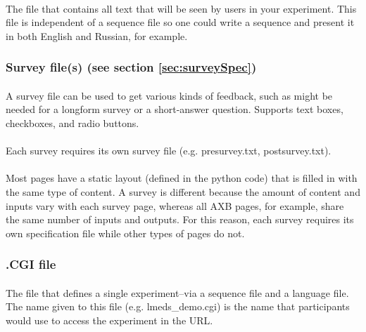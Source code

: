 \paragraph{}
The file that contains all text that will be seen by users in your experiment.  This file is independent of a sequence file so one could write a sequence and present it in both English and Russian, for example.

\subsubsection{Survey file(s) (see section \ref{sec:surveySpec})}

\paragraph{}
A survey file can be used to get various kinds of feedback, such as might be needed for a longform survey or a short-answer question.  Supports text boxes, checkboxes, and radio buttons.

\paragraph{}
Each survey requires its own survey file (e.g. presurvey.txt, postsurvey.txt).

\paragraph{}
Most pages have a static layout (defined in the python code) that is filled in with the same type of content.  A survey is different because the amount of content and inputs vary with each survey page, whereas all AXB pages, for example, share the same number of inputs and outputs.  For this reason, each survey requires its own specification file while other types of pages do not.

\subsubsection{.CGI file}

\paragraph{}
The file that defines a single experiment--via a sequence file and a language file.  The name given to this file (e.g. lmeds\_demo.cgi) is the name that participants would use to access the experiment in the URL.

